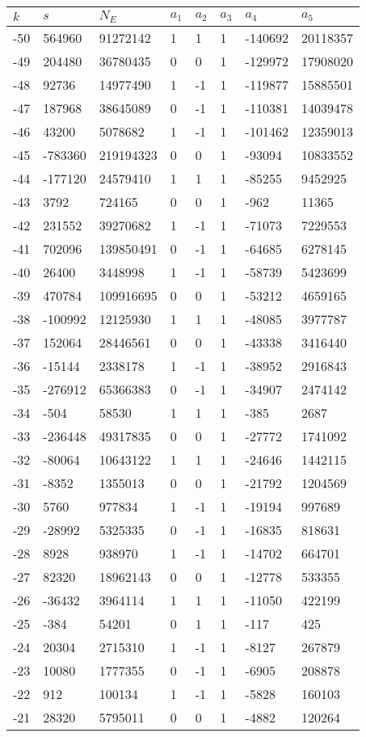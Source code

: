 \documentclass{amsart}
\begin{document}
\begin{longtable}{|l|l|l|lllll|}
\hline
$k$ & $s$ & $N_E$ & $a_1$ & $a_2$ & $a_3$ & $a_4$ & $a_5$\\
\hline
-50&564960&91272142&1&1&1&-140692&20118357\\
-49&204480&36780435&0&0&1&-129972&17908020\\
-48&92736&14977490&1&-1&1&-119877&15885501\\
-47&187968&38645089&0&-1&1&-110381&14039478\\
-46&43200&5078682&1&-1&1&-101462&12359013\\
-45&-783360&219194323&0&0&1&-93094&10833552\\
-44&-177120&24579410&1&1&1&-85255&9452925\\
-43&3792&724165&0&0&1&-962&11365\\
-42&231552&39270682&1&-1&1&-71073&7229553\\
-41&702096&139850491&0&-1&1&-64685&6278145\\
-40&26400&3448998&1&-1&1&-58739&5423699\\
-39&470784&109916695&0&0&1&-53212&4659165\\
-38&-100992&12125930&1&1&1&-48085&3977787\\
-37&152064&28446561&0&0&1&-43338&3416440\\
-36&-15144&2338178&1&-1&1&-38952&2916843\\
-35&-276912&65366383&0&-1&1&-34907&2474142\\
-34&-504&58530&1&1&1&-385&2687\\
-33&-236448&49317835&0&0&1&-27772&1741092\\
-32&-80064&10643122&1&1&1&-24646&1442115\\
-31&-8352&1355013&0&0&1&-21792&1204569\\
-30&5760&977834&1&-1&1&-19194&997689\\
-29&-28992&5325335&0&-1&1&-16835&818631\\
-28&8928&938970&1&-1&1&-14702&664701\\
-27&82320&18962143&0&0&1&-12778&533355\\
-26&-36432&3964114&1&1&1&-11050&422199\\
-25&-384&54201&0&1&1&-117&425\\
-24&20304&2715310&1&-1&1&-8127&267879\\
-23&10080&1777355&0&-1&1&-6905&208878\\
-22&912&100134&1&-1&1&-5828&160103\\
-21&28320&5795011&0&0&1&-4882&120264\\

\end{longtable}
\end{document}
